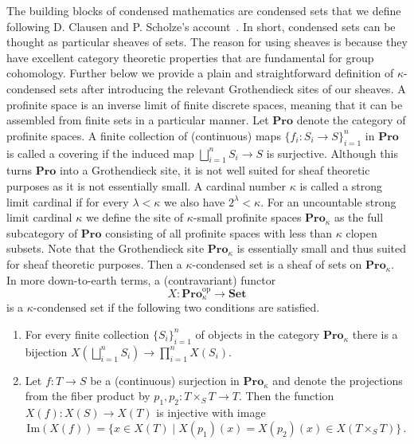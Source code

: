 \documentclass[12pt,a4paper]{article}
\numberwithin{equation}{section}
\theoremstyle{nonumberplain}
\begin{document}
The building blocks of condensed mathematics are condensed sets that we define following D.\! Clausen and P.\! Scholze's account~\cite[Lecture~I and~II]{sch22}. In short, condensed sets can be thought as particular sheaves of sets. The reason for using sheaves is because they have excellent category theoretic properties that are fundamental for group cohomology. Further below we provide a plain and straightforward definition of $\kappa$-condensed sets after introducing the relevant Grothendieck sites of our sheaves. A profinite space is an inverse limit of finite discrete spaces, meaning that it can be assembled from finite sets in a particular manner. Let $\mathbf{Pro}$ denote the category of profinite spaces. A finite collection of (continuous) maps $\lbrace f_i: S_i \rightarrow S \rbrace_{i = 1}^n$ in $\mathbf{Pro}$ is called a covering if the induced map $\bigsqcup_{i = 1}^n S_i \rightarrow S$ is surjective. Although this turns $\mathbf{Pro}$ into a Grothendieck site, it is not well suited for sheaf theoretic purposes as it is not essentially small. A cardinal number $\kappa$ is called a strong limit cardinal if for every $\lambda < \kappa$ we also have $2^{\lambda} < \kappa$. For an uncountable strong limit cardinal $\kappa$ we define the site of $\kappa$-small profinite spaces $\mathbf{Pro}_{\kappa}$ as the full subcategory of $\mathbf{Pro}$ consisting of all profinite spaces with less than $\kappa$ clopen subsets. Note that the Grothendieck site $\mathbf{Pro}_{\kappa}$ is essentially small and thus suited for sheaf theoretic purposes. Then a $\kappa$-condensed set is a sheaf of sets on $\mathbf{Pro}_{\kappa}$. In more down-to-earth terms, a (contravariant) functor
\[ X: \mathbf{Pro}_{\kappa}^{\mathrm{op}} \rightarrow \mathbf{Set} \]
is a $\kappa$-condensed set if the following two conditions are satisfied.
\begin{enumerate}
    \item For every finite collection $\lbrace S_i \rbrace_{i = 1}^n$ of objects in the category $\mathbf{Pro}_{\kappa}$ there is a bijection $X(\bigsqcup_{i = 1}^n S_i) \rightarrow \prod_{i = 1}^n X(S_i)$.
    \item Let $f: T \rightarrow S$ be a (continuous) surjection in $\mathbf{Pro}_{\kappa}$ and denote the projections from the fiber product by $p_1, p_2: T \times_S T \rightarrow T$. Then the function $X(f): X(S) \rightarrow X(T)$ is injective with image
\[ \mathrm{Im}(X(f)) = \lbrace x \in X(T) \mid X(p_1)(x) = X(p_2)(x) \in X(T \times_S T) \rbrace \, . \]
\end{enumerate}
\end{document}
